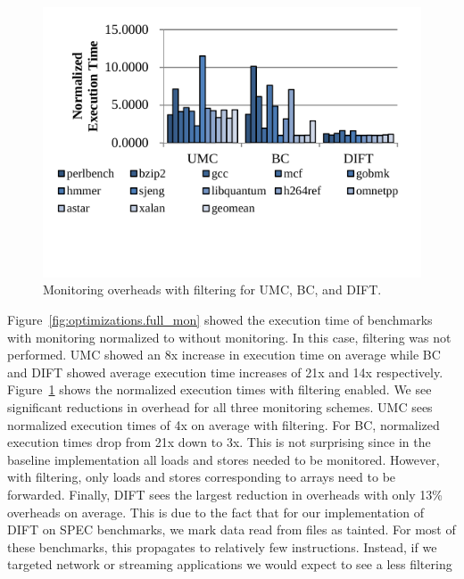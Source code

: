 \begin{figure}
  \begin{center}
    \includegraphics[width=\columnwidth]{figs/data_filtering.pdf}
    \vspace{-0.2in}
    \caption{Monitoring overheads with filtering for UMC, BC, and DIFT.}
    \label{fig:evaluation.filtering}
    \vspace{-0.1in}
  \end{center}
\end{figure}

Figure~\ref{fig:optimizations.full_mon} showed the execution time of benchmarks
with monitoring normalized to without monitoring. In this case, filtering was
not performed. UMC showed an 8x increase in execution
time on average while BC and DIFT showed average execution time increases of
21x and 14x respectively. Figure~\ref{fig:evaluation.filtering} shows the
normalized execution times with filtering enabled. We see significant
reductions in overhead for all three monitoring schemes. UMC sees normalized
execution times of 4x on average with filtering. For BC, normalized execution
times drop from 21x down to 3x. This is not surprising since in the baseline
implementation all loads and stores needed to be monitored. However, with
filtering, only loads and stores corresponding to arrays need to be forwarded.
Finally, DIFT sees the largest reduction in overheads with only 13\% overheads
on average. This is due to the fact that for our implementation of DIFT on SPEC
benchmarks, we mark data read from files as tainted. For most of these
benchmarks, this propagates to relatively few instructions. Instead, if we
targeted network or streaming applications we would expect to see a less
filtering

